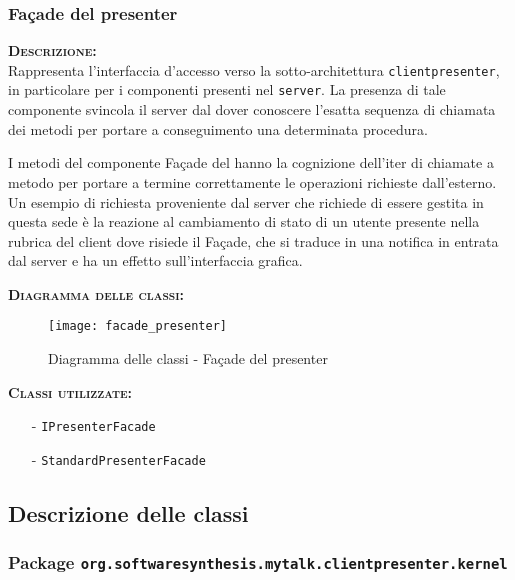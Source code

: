 \subsubsection{Façade del presenter}
\begin{description}
	\item{\scshape\bfseries Descrizione:}\\
Rappresenta l'interfaccia d'accesso verso la sotto-architettura \texttt{clientpresenter}, in particolare per i componenti presenti nel \texttt{server}. La presenza di tale componente svincola il server dal dover conoscere l'esatta sequenza di chiamata dei metodi per portare a conseguimento una determinata procedura.

I metodi del componente Façade del  hanno la cognizione dell'iter di chiamate a metodo per portare a termine correttamente le operazioni richieste dall'esterno. Un esempio di richiesta proveniente dal server che richiede di essere gestita in questa sede è la reazione al cambiamento di stato di un utente presente nella rubrica del client dove risiede il Façade, che si traduce in una notifica in entrata dal server e ha un effetto sull'interfaccia grafica.
	\item{\scshape\bfseries Diagramma delle classi:}
\begin{figure}[H]
\begin{center}
\texttt{[image: facade\_presenter]}
\caption{Diagramma delle classi - Façade del presenter}\label{fig:facade_presenter}
\end{center}
\end{figure}
	\item{\scshape\bfseries Classi utilizzate:} 
	\begin{itemize}[noitemsep,nolistsep]
		\item[-] \texttt{IPresenterFacade}
		\item[-] \texttt{StandardPresenterFacade}
	\end{itemize}
\end{description}

\subsection{Descrizione delle classi}

\subsubsection{Package \texttt{org.softwaresynthesis.mytalk.clientpresenter.kernel}}

